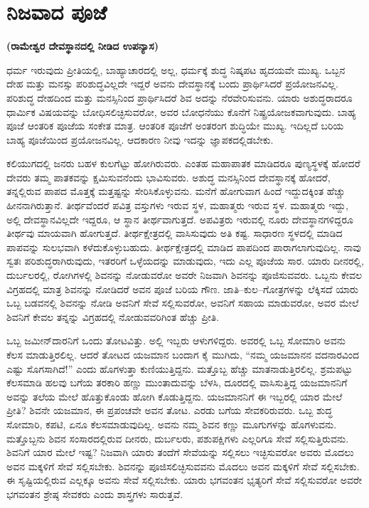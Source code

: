 
\chapter{ನಿಜವಾದ ಪೂಜೆ}

\begin{center}
\textbf{(ರಾಮೇಶ್ವರ ದೇವಸ್ಥಾನದಲ್ಲಿ ನೀಡಿದ ಉಪನ್ಯಾಸ)}
\end{center}

ಧರ್ಮ ಇರುವುದು ಪ್ರೀತಿಯಲ್ಲಿ, ಬಾಹ್ಯಾಚಾರದಲ್ಲಿ ಅಲ್ಲ, ಧರ್ಮಕ್ಕೆ ಶುದ್ಧ ನಿಷ್ಕಪಟ ಹೃದಯವೇ ಮುಖ್ಯ. ಒಬ್ಬನ ದೇಹ ಮತ್ತು ಮನಸ್ಸು ಪರಿಶುದ್ಧವಿಲ್ಲದೇ ಇದ್ದರೆ ಅವನು ದೇವಸ್ಥಾನಕ್ಕೆ ಬಂದು ಪ್ರಾರ್ಥಿಸಿದರೆ ಪ್ರಯೋಜನವಿಲ್ಲ. ಪರಿಶುದ್ಧ ದೇಹದಿಂದ ಮತ್ತು ಮನಸ್ಸಿನಿಂದ ಪ್ರಾರ್ಥಿಸಿದರೆ ಶಿವ ಅದನ್ನು ನೆರವೇರಿಸುವನು. ಯಾರು ಅಶುದ್ಧ\-ರಾದರೂ ಧಾರ್ಮಿಕ ವಿಷಯವನ್ನು ಬೋಧಿಸಲಿಚ್ಛಿಸುವರೋ, ಅವರ ಬೋಧನೆಯು ಕೊನೆಗೆ ನಿಷ್ಪ್ರಯೋಜಕವಾಗುವುದು. ಬಾಹ್ಯ ಪೂಜೆ ಆಂತರಿಕ ಪೂಜೆಯ ಸಂಕೇತ ಮಾತ್ರ. ಆಂತರಿಕ\- ಪೂಜೆಗೆ ಅಂತರಂಗ ಶುದ್ಧಿಯೇ ಮುಖ್ಯ. ಇದಿಲ್ಲದೆ ಬರಿಯ ಬಾಹ್ಯ ಪೂಜೆಯಿಂದ ಪ್ರಯೋಜನವಿಲ್ಲ. ಆದಕಾರಣ ನೀವು ಇದನ್ನು ಜ್ಞಾಪಕದಲ್ಲಿಡಬೇಕು.

ಕಲಿಯುಗದಲ್ಲಿ ಜನರು ಬಹಳ ಕುಲಗೆಟ್ಟು ಹೋಗಿರುವರು. ಎಂತಹ ಮಹಾಪಾತಕ ಮಾಡಿದರೂ ಪುಣ್ಯಸ್ಥಳಕ್ಕೆ ಹೋದರೆ ದೇವರು ತಮ್ಮ ಪಾತಕವನ್ನು ಕ್ಷಮಿಸುವನೆಂದು ಭಾವಿಸುವರು. ಅಶುದ್ಧ ಮನಸ್ಸಿನಿಂದ ದೇವಸ್ಥಾನಕ್ಕೆ ಹೋದರೆ, ತನ್ನಲ್ಲಿರುವ ಪಾಪದ ಮೊತ್ತಕ್ಕೆ ಮತ್ತಷ್ಟನ್ನು ಸೇರಿಸಿಕೊಳ್ಳುವನು. ಮನೆಗೆ ಹೋಗುವಾಗ ಹಿಂದೆ ಇದ್ದುದಕ್ಕಿಂತ ಹೆಚ್ಚು ಹೀನನಾಗಿರುತ್ತಾನೆ. ತೀರ್ಥವೆಂದರೆ ಪವಿತ್ರ ವಸ್ತುಗಳು ಇರುವ ಸ್ಥಳ, ಮಹಾತ್ಮರು ಇರುವ ಸ್ಥಳ. ಮಹಾತ್ಮರು ಇದ್ದು, ಅಲ್ಲಿ ದೇವಸ್ಥಾನವಿಲ್ಲದೇ ಇದ್ದರೂ, ಆ ಸ್ಥಾನ ತೀರ್ಥವಾಗುತ್ತದೆ. ಅಪವಿತ್ರರು ಇರುವಲ್ಲಿ ನೂರು ದೇವಸ್ಥಾನಗಳಿದ್ದರೂ ತೀರ್ಥವು ಮಾಯವಾಗಿ ಹೋಗುತ್ತದೆ. ತೀರ್ಥಕ್ಷೇತ್ರದಲ್ಲಿ ವಾಸಿಸುವುದು ಅತಿ ಕಷ್ಟ. ಸಾಧಾರಣ ಸ್ಥಳದಲ್ಲಿ ಮಾಡಿದ ಪಾಪವನ್ನು ಸುಲಭವಾಗಿ ಕಳೆದುಕೊಳ್ಳುಬಹುದು. ತೀರ್ಥಕ್ಷೇತ್ರದಲ್ಲಿ ಮಾಡಿದ ಪಾಪದಿಂದ ಪಾರಾಗಲಾಗುವುದಿಲ್ಲ. ನಾವು ಸ್ವತಃ ಪರಿಶುದ್ಧರಾಗಿರುವುದು, ಇತರರಿಗೆ ಒಳ್ಳೆಯದನ್ನು ಮಾಡುವುದು, ಇದು ಎಲ್ಲ ಪೂಜೆಯ ಸಾರ. ಯಾರು ದೀನರಲ್ಲಿ, ದುರ್ಬಲರಲ್ಲಿ, ರೋಗಿಗಳಲ್ಲಿ ಶಿವನನ್ನು ನೋಡುವರೋ ಅವರೇ ನಿಜವಾಗಿ ಶಿವನನ್ನು ಪೂಜಿಸುವವರು. ಒಬ್ಬನು ಕೇವಲ ವಿಗ್ರಹದಲ್ಲಿ ಮಾತ್ರ ಶಿವನನ್ನು ನೋಡಿದರೆ ಅವನ ಪೂಜೆ ಬರಿಯ ಗೌಣ. ಜಾತಿ–ಕುಲ–ಗೋತ್ರಗಳನ್ನು ಲೆಕ್ಕಿಸದೆ ಯಾರು ಒಬ್ಬ ಬಡವನಲ್ಲಿ ಶಿವನನ್ನು ನೋಡಿ ಅವನಿಗೆ ಸೇವೆ ಸಲ್ಲಿಸುವರೋ, ಅವನಿಗೆ ಸಹಾಯ ಮಾಡುವರೋ, ಅವರ ಮೇಲೆ ಶಿವನಿಗೆ ಕೇವಲ ತನ್ನನ್ನು ವಿಗ್ರಹದಲ್ಲಿ ನೋಡುವವರಿಗಿಂತ ಹೆಚ್ಚು ಪ್ರೀತಿ.

ಒಬ್ಬ ಜಮೀನ್​ದಾರನಿಗೆ ಒಂದು ತೋಟವಿತ್ತು. ಅಲ್ಲಿ ಇಬ್ಬರು ಆಳುಗಳಿದ್ದರು. ಅವರಲ್ಲಿ ಒಬ್ಬ ಸೋಮಾರಿ ಅವನು ಕೆಲಸ ಮಾಡುತ್ತಿರಲಿಲ್ಲ. ಆದರೆ ತೋಟದ ಯಜಮಾನ ಬಂದಾಗ ಕೈ ಮುಗಿದು, “ನಮ್ಮ ಯಜಮಾನನ ವದನಾರವಿಂದ ಎಷ್ಟು ಸೊಗಸಾಗಿದೆ!” ಎಂದು ಹೊಗಳುತ್ತಾ ಕುಣಿಯುತ್ತಿದ್ದನು. ಮತ್ತೊಬ್ಬ ಹೆಚ್ಚು ಮಾತನಾಡುತ್ತಿರಲಿಲ್ಲ. ಶ್ರಮಪಟ್ಟು ಕೆಲಸಮಾಡಿ ಹಲವು ಬಗೆಯ ತರಕಾರಿ ಹಣ್ಣು ಮುಂತಾದುವನ್ನು ಬೆಳಸಿ, ದೂರದಲ್ಲಿ ವಾಸಿಸುತ್ತಿದ್ದ ಯಜಮಾನನಿಗೆ ಅವನ್ನು ತಲೆಯ ಮೇಲೆ ಹೊತ್ತುಕೊಂಡು ಹೋಗಿ ಕೊಡುತ್ತಿದ್ದನು. ಯಜಮಾನನಿಗೆ ಈ ಇಬ್ಬರಲ್ಲಿ ಯಾರ ಮೇಲೆ ಪ್ರೀತಿ? ಶಿವನೇ ಯಜಮಾನ, ಈ ಪ್ರಪಂಚವೇ ಅವನ ತೋಟ. ಎರಡು ಬಗೆಯ ಸೇವಕರಿರುವರು. ಒಬ್ಬ ಶುದ್ಧ ಸೋಮಾರಿ, ಕಪಟಿ, ಏನೂ ಕೆಲಸಮಾಡುವುದಿಲ್ಲ. ಅವನು ನಮ್ಮ ಶಿವನ ಕಣ್ಣು ಮೂಗುಗಳನ್ನು ಹೊಗಳುವನು. ಮತ್ತೊಬ್ಬನು ಶಿವನ ಸಂಸಾರದಲ್ಲಿರುವ ದೀನರು, ದುರ್ಬಲರು, ಪಶುಪಕ್ಷಿಗಳು ಎಲ್ಲರಿಗೂ ಸೇವೆ ಸಲ್ಲಿಸುತ್ತಿರುವನು. ಶಿವನಿಗೆ ಯಾರ ಮೇಲೆ ಇಷ್ಟ? ನಿಜವಾಗಿ ಯಾರು ತಂದೆಗೆ ಸೇವೆಯನ್ನು ಸಲ್ಲಿಸಲು ಇಚ್ಛಿಸುವರೋ ಅವರು ಮೊದಲು ಅವನ ಮಕ್ಕಳಿಗೆ ಸೇವೆ ಸಲ್ಲಿಸಬೇಕು. ಶಿವನನ್ನು ಪೂಜಿಸಲಿಚ್ಛಿಸುವವನು ಮೊದಲು ಅವನ ಮಕ್ಕಳಿಗೆ ಸೇವೆ ಸಲ್ಲಿಸಬೇಕು. ಈ ಸೃಷ್ಟಿಯಲ್ಲಿರುವ ಎಲ್ಲಕ್ಕೂ ಅವನು ಸೇವೆ ಸಲ್ಲಿಸಬೇಕು. ಯಾರು ಭಗವಂತನ ಭೃತ್ಯರಿಗೆ ಸೇವೆ ಸಲ್ಲಿಸುವರೋ ಅವರೇ ಭಗವಂತನ ಶ್ರೇಷ್ಠ ಸೇವಕರು ಎಂದು ಶಾಸ್ತ್ರಗಳು ಸಾರುತ್ತವೆ.

